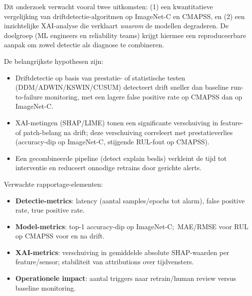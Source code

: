 

Dit onderzoek verwacht vooral twee uitkomsten: (1) een kwantitatieve vergelijking van driftdetectie-algoritmen op ImageNet-C en CMAPSS, en (2) een inzichtelijke XAI-analyse die verklaart \textit{waarom} de modellen degraderen. De doelgroep (ML engineers en reliability teams) krijgt hiermee een reproduceerbare aanpak om zowel detectie als diagnose te combineren.

De belangrijkste hypothesen zijn:

\begin{itemize}
	\item Driftdetectie op basis van prestatie- of statistische testen (DDM/ADWIN/KSWIN/CUSUM) detecteert drift sneller dan baseline run-to-failure monitoring, met een lagere false positive rate op CMAPSS dan op ImageNet-C.
	\item XAI-metingen (SHAP/LIME) tonen een significante verschuiving in feature- of patch-belang na drift; deze verschuiving correleert met prestatieverlies (accuracy-dip op ImageNet-C, stijgende RUL-fout op CMAPSS).
	\item Een gecombineerde pipeline (detect \textrightarrow{} explain \textrightarrow{} beslis) verkleint de tijd tot interventie en reduceert onnodige retrains door gerichte alerts.
\end{itemize}

Verwachte rapportage-elementen:

\begin{itemize}
	\item \textbf{Detectie-metrics}: latency (aantal samples/epochs tot alarm), false positive rate, true positive rate.
	\item \textbf{Model-metrics}: top-1 accuracy-dip op ImageNet-C;\ MAE/RMSE voor RUL op CMAPSS voor en na drift.
	\item \textbf{XAI-metrics}: verschuiving in gemiddelde absolute SHAP-waarden per feature/sensor; stabiliteit van attributions over tijdvensters.
	\item \textbf{Operationele impact}: aantal triggers naar retrain/human review versus baseline monitoring.
\end{itemize}


